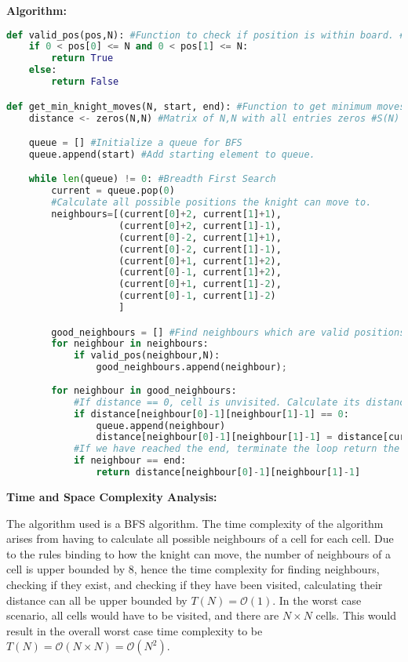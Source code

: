 \documentclass[10pt, a4paper]{article}
\newcommand{\BigO}{\mathcal{O}}
\begin{document}
\textbf{Algorithm:}
\begin{lstlisting}[language=Python,caption= Get Minimum Knight Moves]
def valid_pos(pos,N): #Function to check if position is within board. #T(N) = O(1)
    if 0 < pos[0] <= N and 0 < pos[1] <= N:
        return True
    else:
        return False

def get_min_knight_moves(N, start, end): #Function to get minimum moves of knight.
    distance <- zeros(N,N) #Matrix of N,N with all entries zeros #S(N) = O(N)

    queue = [] #Initialize a queue for BFS
    queue.append(start) #Add starting element to queue.

    while len(queue) != 0: #Breadth First Search
        current = queue.pop(0)
        #Calculate all possible positions the knight can move to.
        neighbours=[(current[0]+2, current[1]+1), 
                    (current[0]+2, current[1]-1),
                    (current[0]-2, current[1]+1),
                    (current[0]-2, current[1]-1),
                    (current[0]+1, current[1]+2),
                    (current[0]-1, current[1]+2),
                    (current[0]+1, current[1]-2),
                    (current[0]-1, current[1]-2)
                    ]

        good_neighbours = [] #Find neighbours which are valid positions on the board
        for neighbour in neighbours:
            if valid_pos(neighbour,N):
                good_neighbours.append(neighbour);
                
        for neighbour in good_neighbours:
            #If distance == 0, cell is unvisited. Calculate its distance and add it to the queue.
            if distance[neighbour[0]-1][neighbour[1]-1] == 0:
                queue.append(neighbour)
                distance[neighbour[0]-1][neighbour[1]-1] = distance[current[0]-1][current[1]-1] + 1
            #If we have reached the end, terminate the loop return the distance.
            if neighbour == end:
                return distance[neighbour[0]-1][neighbour[1]-1]
\end{lstlisting}

\textbf{Time and Space Complexity Analysis:}

The algorithm used is a BFS algorithm. The time complexity of the algorithm arises from having to calculate all possible neighbours of a cell for each cell. Due to the rules binding to how the knight can move, the number of neighbours of a cell is upper bounded by 8, hence the time complexity for finding neighbours, checking if they exist, and checking if they have been visited, calculating their distance can all be upper bounded by $T(N) = \BigO(1)$. In the worst case scenario, all cells would have to be visited, and there are $N\times N$ cells. This would result in the overall worst case time complexity to be $T(N) = \BigO(N\times N) = \BigO(N^2)$.
\end{document}
